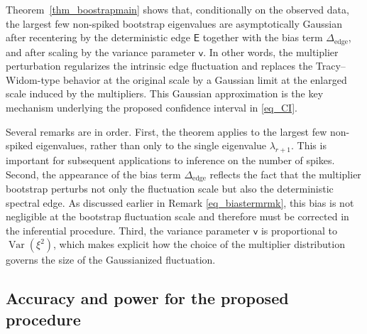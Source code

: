 \documentclass[12pt]{article}
\theoremstyle{plain}
\numberwithin{equation}{section}
\begin{document}
Theorem~\ref{thm_boostrapmain} shows that, conditionally on the observed data, the largest few non-spiked bootstrap eigenvalues are asymptotically Gaussian after recentering by the deterministic edge $\mathsf E$ together with the bias term $\Delta_{\mathrm{edge}}$, and after scaling by the variance parameter $\mathsf v$. In other words, the multiplier perturbation regularizes the intrinsic edge fluctuation and replaces the Tracy--Widom-type behavior at the original scale by a Gaussian limit at the enlarged scale induced by the multipliers. This Gaussian approximation is the key mechanism underlying the proposed confidence interval in \eqref{eq_CI}.

Several remarks are in order. First, the theorem applies to the largest few non-spiked eigenvalues, rather than only to the single eigenvalue $\lambda_{r+1}$. This is important for subsequent applications to inference on the number of spikes. Second, the appearance of the bias term $\Delta_{\mathrm{edge}}$ reflects the fact that the multiplier bootstrap perturbs not only the fluctuation scale but also the deterministic spectral edge. As discussed earlier in Remark \ref{eq_biastermrmk}, this bias is not negligible at the bootstrap fluctuation scale and therefore must be corrected in the inferential procedure. Third, the variance parameter $\mathsf v$ is proportional to $\operatorname{Var}(\xi^2)$, which makes explicit how the choice of the multiplier distribution governs the size of the Gaussianized fluctuation. 








\subsection{Accuracy and power for the proposed procedure}\label{sec_accuracyandpower}
\end{document}
